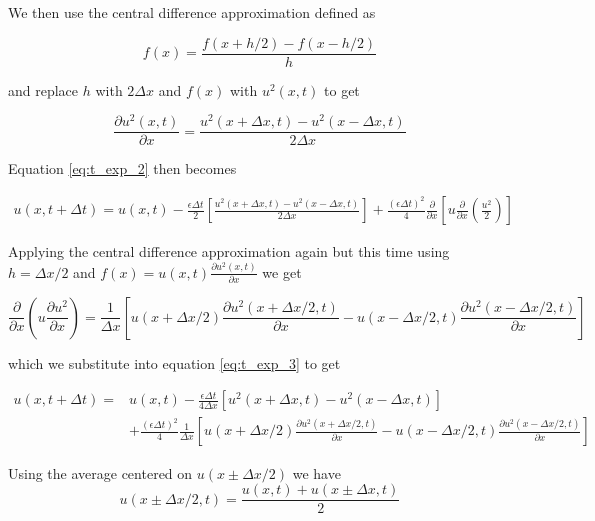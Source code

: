 \documentclass{article}
\begin{document}
We then use the central difference approximation defined as 

\begin{equation}
	f(x) = \frac{f(x+h/2) - f(x-h/2)}{h}
\end{equation}

and replace $h$ with $2\Delta x$ and $f(x)$ with $u^2(x,t)$ to get 

\begin{equation}
	\frac{\partial u^2(x,t)}{\partial x} = \frac{u^2(x+\Delta x, t) - u^2(x-\Delta x, t)}{2\Delta x}
\end{equation}

Equation \ref{eq:t_exp_2} then becomes

\begin{equation}
\begin{split}
	\label{eq:t_exp_3}
	u(x,t+\Delta t) = u(x,t) - \frac{\epsilon \Delta t}{2} \left[ \frac{u^2(x+\Delta x, t) - u^2(x-\Delta x, t)}{2\Delta x} \right] + \frac{(\epsilon\Delta t)^2}{4}\frac{\partial}{\partial x }\left[u\frac{\partial}{\partial x}\left(\frac{u^2}{2}\right) \right]
\end{split}
\end{equation}

Applying the central difference approximation again but this time using $h=\Delta x/2$ and $f(x)=u(x,t)\frac{\partial u^2(x,t)}{\partial x}$ we get 

\begin{equation}
	\frac{\partial}{\partial x}\left(u\frac{\partial u^2}{\partial x} \right) = \frac{1}{\Delta x} \left[u(x+\Delta x/2)\frac{\partial u^2(x+\Delta x/2, t)}{\partial x} - u(x-\Delta x/2, t)\frac{\partial u^2(x-\Delta x/2, t)}{\partial x} \right]
\end{equation}

which we substitute into equation \ref{eq:t_exp_3} to get

\begin{equation}
\begin{split}
	u(x,t+\Delta t) = & u(x,t) - \frac{\epsilon \Delta t}{4 \Delta x} \left[ u^2(x+\Delta x, t) - u^2(x-\Delta x, t) \right] 
	\\ & + \frac{(\epsilon\Delta t)^2}{4}\frac{1}{\Delta x} \left[u(x+\Delta x/2)\frac{\partial u^2(x+\Delta x/2, t)}{\partial x} - u(x-\Delta x/2, t)\frac{\partial u^2(x-\Delta x/2, t)}{\partial x} \right]
\end{split}
\end{equation}

Using the average centered on $u(x\pm \Delta x/2)$ we have
\begin{equation}
	u(x\pm \Delta x/2, t) = \frac{u(x,t)+u(x\pm \Delta x,t)}{2}
\end{equation}
\end{document}
